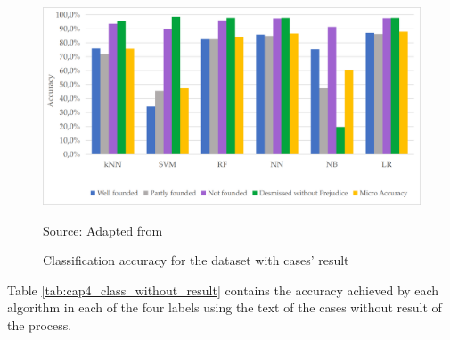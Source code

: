 \begin{figure}[htb]
    \centering
    \caption{Classification accuracy for the dataset with cases' result}
    \label{fig:cap4_class_with_result}
    \includegraphics[width=\textwidth]{images/chapters/cap4_classification_with_result.png}
    
    Source: Adapted from \textcite{Sabo2019}
\end{figure}

Table \ref{tab:cap4_class_without_result} contains the accuracy achieved by each algorithm in each of the four labels using the text of the cases without result of the process. 


